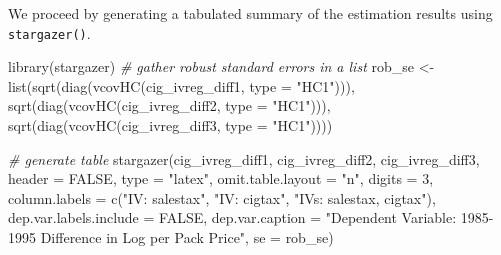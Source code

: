 \documentclass[
  14pt,
]{memoir}
\newenvironment{Shaded}{\begin{snugshade}}{\end{snugshade}}
\newcommand{\AttributeTok}[1]{\textcolor[rgb]{0.77,0.63,0.00}{#1}}
\newcommand{\CommentTok}[1]{\textcolor[rgb]{0.56,0.35,0.01}{\textit{#1}}}
\newcommand{\ConstantTok}[1]{\textcolor[rgb]{0.00,0.00,0.00}{#1}}
\newcommand{\DecValTok}[1]{\textcolor[rgb]{0.00,0.00,0.81}{#1}}
\newcommand{\FunctionTok}[1]{\textcolor[rgb]{0.00,0.00,0.00}{#1}}
\newcommand{\NormalTok}[1]{#1}
\newcommand{\OtherTok}[1]{\textcolor[rgb]{0.56,0.35,0.01}{#1}}
\newcommand{\StringTok}[1]{\textcolor[rgb]{0.31,0.60,0.02}{#1}}
\begin{document}
We proceed by generating a tabulated summary of the estimation results using \texttt{stargazer()}.

\begin{Shaded}
\begin{Highlighting}[]
\FunctionTok{library}\NormalTok{(stargazer)}
\CommentTok{\# gather robust standard errors in a list}
\NormalTok{rob\_se }\OtherTok{\textless{}{-}} \FunctionTok{list}\NormalTok{(}\FunctionTok{sqrt}\NormalTok{(}\FunctionTok{diag}\NormalTok{(}\FunctionTok{vcovHC}\NormalTok{(cig\_ivreg\_diff1, }\AttributeTok{type =} \StringTok{"HC1"}\NormalTok{))),}
               \FunctionTok{sqrt}\NormalTok{(}\FunctionTok{diag}\NormalTok{(}\FunctionTok{vcovHC}\NormalTok{(cig\_ivreg\_diff2, }\AttributeTok{type =} \StringTok{"HC1"}\NormalTok{))),}
               \FunctionTok{sqrt}\NormalTok{(}\FunctionTok{diag}\NormalTok{(}\FunctionTok{vcovHC}\NormalTok{(cig\_ivreg\_diff3, }\AttributeTok{type =} \StringTok{"HC1"}\NormalTok{))))}

\CommentTok{\# generate table}
\FunctionTok{stargazer}\NormalTok{(cig\_ivreg\_diff1, cig\_ivreg\_diff2, cig\_ivreg\_diff3,}
  \AttributeTok{header =} \ConstantTok{FALSE}\NormalTok{, }
  \AttributeTok{type =} \StringTok{"latex"}\NormalTok{,}
  \AttributeTok{omit.table.layout =} \StringTok{"n"}\NormalTok{,}
  \AttributeTok{digits =} \DecValTok{3}\NormalTok{, }
  \AttributeTok{column.labels =} \FunctionTok{c}\NormalTok{(}\StringTok{"IV: salestax"}\NormalTok{, }\StringTok{"IV: cigtax"}\NormalTok{, }
                    \StringTok{"IVs: salestax, cigtax"}\NormalTok{),}
  \AttributeTok{dep.var.labels.include =} \ConstantTok{FALSE}\NormalTok{,}
  \AttributeTok{dep.var.caption =} 
\StringTok{"Dependent Variable: 1985{-}1995 Difference in Log per Pack Price"}\NormalTok{,}
  \AttributeTok{se =}\NormalTok{ rob\_se)}
\end{Highlighting}
\end{Shaded}
\end{document}
